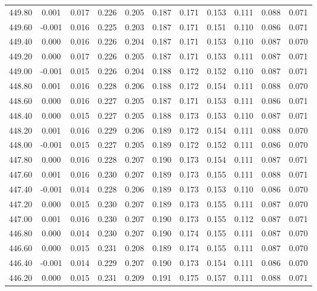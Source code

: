 \begin{longtable}{cccccccccc}
    449.80 &  0.001 &  0.017 &  0.226 &  0.205 &  0.187 &  0.171 &  0.153 &  0.111 &  0.088 &  0.071 \\
    449.60 & -0.001 &  0.016 &  0.225 &  0.203 &  0.187 &  0.171 &  0.151 &  0.110 &  0.086 &  0.071 \\
    449.40 &  0.000 &  0.016 &  0.226 &  0.204 &  0.187 &  0.171 &  0.153 &  0.110 &  0.087 &  0.070 \\
    449.20 &  0.000 &  0.017 &  0.226 &  0.205 &  0.187 &  0.171 &  0.153 &  0.111 &  0.087 &  0.071 \\
    449.00 & -0.001 &  0.015 &  0.226 &  0.204 &  0.188 &  0.172 &  0.152 &  0.110 &  0.087 &  0.071 \\
    448.80 &  0.001 &  0.016 &  0.228 &  0.206 &  0.188 &  0.172 &  0.154 &  0.111 &  0.088 &  0.070 \\
    448.60 &  0.000 &  0.016 &  0.227 &  0.205 &  0.187 &  0.171 &  0.153 &  0.111 &  0.086 &  0.071 \\
    448.40 &  0.000 &  0.015 &  0.227 &  0.205 &  0.188 &  0.173 &  0.153 &  0.110 &  0.087 &  0.071 \\
    448.20 &  0.001 &  0.016 &  0.229 &  0.206 &  0.189 &  0.172 &  0.154 &  0.111 &  0.088 &  0.070 \\
    448.00 & -0.001 &  0.015 &  0.227 &  0.205 &  0.189 &  0.172 &  0.152 &  0.111 &  0.086 &  0.070 \\
    447.80 &  0.000 &  0.016 &  0.228 &  0.207 &  0.190 &  0.173 &  0.154 &  0.111 &  0.087 &  0.071 \\
    447.60 &  0.001 &  0.016 &  0.230 &  0.207 &  0.189 &  0.173 &  0.155 &  0.111 &  0.088 &  0.071 \\
    447.40 & -0.001 &  0.014 &  0.228 &  0.206 &  0.189 &  0.173 &  0.153 &  0.110 &  0.086 &  0.070 \\
    447.20 &  0.000 &  0.015 &  0.230 &  0.207 &  0.189 &  0.173 &  0.155 &  0.111 &  0.087 &  0.070 \\
    447.00 &  0.001 &  0.016 &  0.230 &  0.207 &  0.190 &  0.173 &  0.155 &  0.112 &  0.087 &  0.071 \\
    446.80 &  0.000 &  0.014 &  0.230 &  0.207 &  0.190 &  0.174 &  0.155 &  0.111 &  0.087 &  0.070 \\
    446.60 &  0.000 &  0.015 &  0.231 &  0.208 &  0.189 &  0.174 &  0.155 &  0.111 &  0.087 &  0.070 \\
    446.40 & -0.001 &  0.014 &  0.229 &  0.207 &  0.190 &  0.173 &  0.154 &  0.111 &  0.086 &  0.070 \\
    446.20 &  0.000 &  0.015 &  0.231 &  0.209 &  0.191 &  0.175 &  0.157 &  0.111 &  0.088 &  0.071 \\

\end{longtable}
